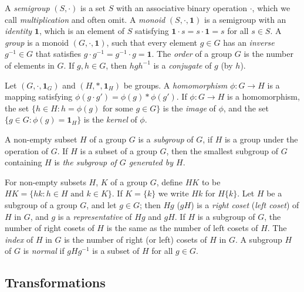 \documentclass{llncs}
\newcommand{\one}{{\mathbf 1}}
\begin{document}
A \emph{semigroup} $(S,\cdot)$ is a set $S$ with an associative binary operation $\cdot$, which we call \emph{multiplication} and often omit. A \emph{monoid} $(S,\cdot,\one)$ is a semigroup with an \emph{identity}
$\one$, which is an element of $S$ satisfying $\one \cdot s = s \cdot \one=s$ for all $s\in S$.
A \emph{group} is a monoid $(G,\cdot,\one)$, such that every element $g\in G$ has an \emph{inverse} $g^{-1}\in G$ that satisfies $g\cdot g^{-1}=g^{-1}\cdot g=\one$.
The \emph{order} of a group $G$ is the number of elements in $G$.
If $g,h\in G$, then $hgh^{-1}$ is a \emph{conjugate} of $g$ (by $h$).

Let $(G,\cdot,\one_G)$ and $(H,\ast,\one_H)$ be groups.
A \emph{homomorphism} $\phi\colon G\to H$ is a mapping satisfying 
$\phi(g\cdot g')=\phi(g)\ast \phi(g')$.
If $\phi\colon G\to H$ is a homomorphism, the set $\{h\in H\colon h=\phi(g) \text{ for some } g\in G\}$ is the \emph{image} of $\phi$, and the set $\{g\in G\colon \phi(g)=\one_H\}$ is the \emph{kernel} of $\phi$.


A non-empty subset $H$ of a group $G$ is a \emph{subgroup} of $G$, if 
$H$ is a group under the operation of $G$.
If $H$ is a subset of a group $G$, then the smallest subgroup of $G$ containing $H$ is \emph{the subgroup of $G$ generated by $H$}.

For non-empty subsets $H$, $K$ of a group $G$, define
$HK$ to be $HK=\{hk\colon h\in H \text{ and } k\in K\}$.
If $K=\{k\}$ we write $Hk$ for $H\{k\}$.
Let $H$ be a subgroup of a group $G$, and let $g\in G$; then $Hg$ ($gH$) is a 
\emph{right coset} (\emph{left coset}) of $H$ in $G$, and $g$ is a \emph{representative} of $Hg$ and $gH$.
If $H$ is a subgroup of $G$, the number of right cosets of $H$ is the same as the number of left cosets of $H$. The \emph{index} of $H$ in $G$ is the number of right (or left) cosets of $H$ in $G$.
A subgroup $H$ of $G$ is \emph{normal} if $gHg^{-1}$ is a subset of $H$ for all $g\in G$.


\subsection{Transformations}
\end{document}
